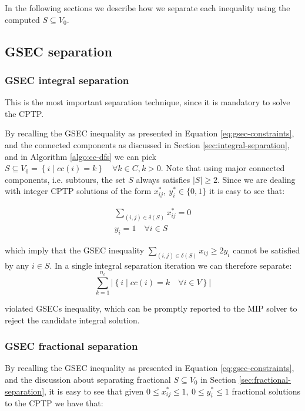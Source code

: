 In the following sections we describe how we separate each inequality using the computed $S \subseteq V_0$.

\subsection{GSEC separation}

\subsubsection{GSEC integral separation}
This is the most important separation technique, since it is mandatory to solve the CPTP.

By recalling the GSEC inequality as presented in Equation \eqref{eq:gsec-constraints}, and the connected components as discussed in Section \ref{sec:integral-separation}, and in Algorithm \ref{algo:cc-dfs} we can pick $S \subseteq V_0 = \left\{ i \mid cc(i) = k  \right\}   \quad \forall k \in C, k > 0$.
Note that using major connected components, i.e. subtours, the set $S$ always satisfies $|S| \ge 2$.
Since we are dealing with integer CPTP solutions of the form $x^*_{ij},\ y^*_{i} \in \{0, 1\}$ it is easy to see that:

\begin{align}
	\sum_{(i, j) \in \delta(S)} x^*_{ij} = 0 \\
	y_i =  1 \quad \forall i \in S
\end{align}

which imply that the GSEC inequality $\sum_{(i, j) \in \delta(S)} x_{ij} \ge 2 y_i$ cannot be satisfied by any $i \in S$.
In a single integral separation iteration we can therefore separate:
\begin{equation}
	\sum^{n_c}_{k = 1} |\left\{ i \mid cc(i) = k \quad \forall i \in V \right\}|
\end{equation}

violated GSECs inequality, which can be promptly reported to the MIP solver to reject the candidate integral solution.


\subsubsection{GSEC fractional separation}

By recalling the GSEC inequality as presented in Equation \eqref{eq:gsec-constraints}, and the discussion about separating fractional $S \subseteq V_0$ in Section \ref{sec:fractional-separation}, it is easy to see that given $0 \le x^*_{ij} \le 1,\ 0 \le y^*_{i} \le 1$ fractional solutions to the CPTP we have that:

